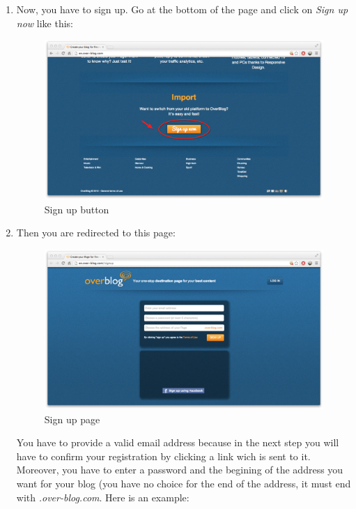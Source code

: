 \documentclass[a4paper,10pt]{article}
\begin{document}
\begin{enumerate}
\item Now, you have to sign up. Go at the bottom of the page and click on \emph{Sign up now} like this:
\begin{figure}[H]
    \center
	\includegraphics[width=13cm]{Images/signUpButton.png}
    \caption{Sign up button}
\end{figure}
\item Then you are redirected to this page:
\begin{figure}[H]
    \center
	\includegraphics[width=13cm]{Images/signUpPage.png}
    \caption{Sign up page}
\end{figure}

You have to provide a valid email address because in the next step you will have to confirm your registration by clicking a link wich is sent to it. Moreover, you have to enter a password and the begining of the address you want for your blog (you have no choice for the end of the address, it must end with \emph{.over-blog.com}. Here is an example:


\end{enumerate}
\end{document}
